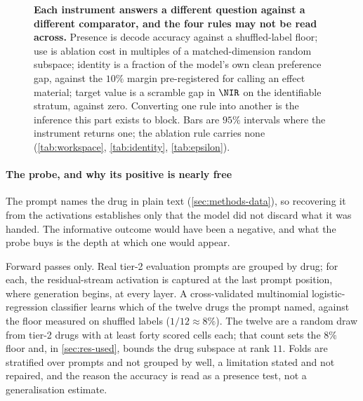 \begin{figure}[htbp]
\begin{fullwidth}
\centering

\caption[Four questions, four comparators]{\textbf{Each instrument answers a
different question against a different comparator, and the four rules may not be
read across.} Presence is decode accuracy against a shuffled-label floor; use is
ablation cost in multiples of a matched-dimension random subspace; identity is a
fraction of the model's own clean preference gap, against the $10\%$ margin
pre-registered for calling an effect material; target value is a scramble gap in
$\NIR$ on the identifiable stratum, against zero. Converting one rule into
another is the inference this part exists to block. Bars are $95\%$ intervals
where the instrument returns one; the ablation rule carries none
(\cref{tab:workspace}, \cref{tab:identity}, \cref{tab:epsilon}).}
\label{fig:comparators}
\end{fullwidth}
\end{figure}

\paragraph{The probe, and why its positive is nearly free} The prompt names the
drug in plain text (\cref{sec:methods-data}), so recovering it from the
activations establishes only that the model did not discard what it was handed.
The informative outcome would have been a negative, and what the probe buys is
the depth at which one would appear.

Forward passes only. Real tier-2 evaluation prompts are grouped by drug; for
each, the residual-stream activation is captured at the last prompt position,
where generation begins, at every layer. A cross-validated multinomial
logistic-regression classifier learns which of the twelve drugs the prompt named,
against the floor measured on shuffled labels ($1/12 \approx 8\%$). The twelve
are a random draw from tier-2 drugs with at least forty scored cells each; that
count sets the $8\%$ floor and, in \cref{sec:res-used}, bounds the drug subspace
at rank $11$. Folds are stratified over prompts and not grouped by well, a
limitation stated and not repaired, and the reason the accuracy is read as a
presence test, not a generalisation estimate.


